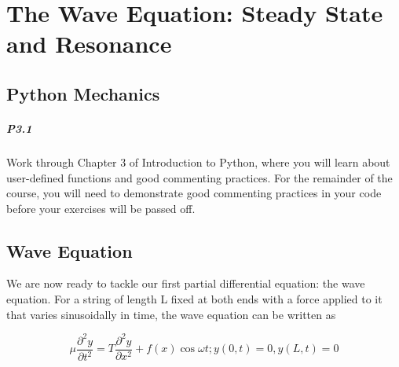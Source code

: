 
\chapter*{The Wave Equation: Steady State and Resonance}
\section*{Python Mechanics}

\paragraph*{P3.1} Work through Chapter 3 of Introduction to Python, where you will learn
about user-defined functions and good commenting practices. For the
remainder of the course, you will need to demonstrate good commenting
practices in your code before your exercises will be passed off.
\section*{Wave Equation}

We are now ready to tackle our first partial differential equation: the wave equation. For a string of length L fixed at both ends with a force applied to it that varies
sinusoidally in time, the wave equation can be written as


\begin{equation}\label{eq:31}
		\mu \frac{\partial^2 y}{\partial t^2} = T \frac{\partial^2y}{\partial x^2} + f(x) \cos \omega t ; y(0,t) = 0, y(L,t) = 0
				\end{equation}
				
